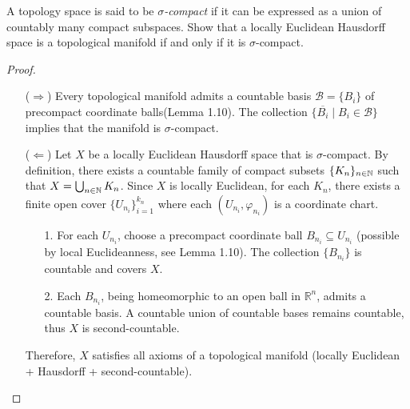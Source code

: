 \begin{problem}
  A topology space is said to be \emph{$\sigma$-compact} if it can be expressed as a union of countably many compact subspaces. Show that a locally Euclidean Hausdorff space is a topological manifold if and only if it is $\sigma$-compact.
  \begin{proof}
    \begin{enumerate}
      \item[($\Rightarrow$)] Every topological manifold admits a countable basis $\mathcal{B} = \{B_i\}$ of precompact coordinate balls(Lemma 1.10). The collection $\{\overline{B_i} \mid B_i \in \mathcal{B}\}$ implies that the manifold is $\sigma$-compact.
      \item[($\Leftarrow$)] Let $X$ be a locally Euclidean Hausdorff space that is $\sigma$-compact. By definition, there exists a countable family of compact subsets $\{K_n\}_{n \in \mathbb{N}}$ such that $X = \bigcup_{n \in \mathbb{N}} K_n$.
      Since $X$ is locally Euclidean, for each $K_n$, there exists a finite open cover $\{U_{n_i}\}_{i=1}^{k_n}$ where each $(U_{n_i}, \varphi_{n_i})$ is a coordinate chart.
      \begin{enumerate}
        \item[1.] For each $U_{n_i}$, choose a precompact coordinate ball $B_{n_i} \subseteq U_{n_i}$ (possible by local Euclideanness, see Lemma 1.10). The collection $\{B_{n_i}\}$ is countable and covers $X$.
        \item[2.] Each $B_{n_i}$, being homeomorphic to an open ball in $\mathbb{R}^n$, admits a countable basis. A countable union of countable bases remains countable, thus $X$ is second-countable.
      \end{enumerate}
      Therefore, $X$ satisfies all axioms of a topological manifold (locally Euclidean + Hausdorff + second-countable).
    \end{enumerate}
  \end{proof}
\end{problem}

